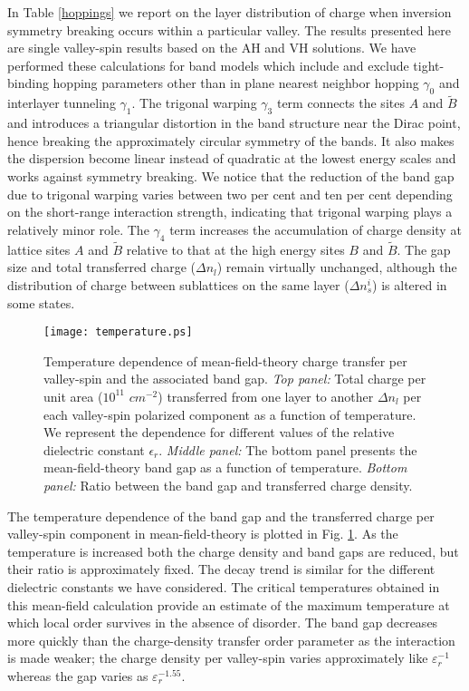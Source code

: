 \documentclass[twocolumn,prb,showpacs,preprintnumbers,amsmath,amssymb]{revtex4}
\begin{document}
In Table \ref{hoppings} we report on the layer 
distribution of charge when inversion symmetry breaking occurs within a particular valley.
The results presented here are single valley-spin results based on the AH and VH solutions.
We have performed these calculations for band models which include and exclude tight-binding hopping 
parameters other than in plane
nearest neighbor hopping $\gamma_0$ and interlayer tunneling $\gamma_1$.
The trigonal warping $\gamma_3$ term connects the sites $A$ and $\widetilde{B}$ 
and introduces a triangular distortion in the band structure 
near the Dirac point, hence breaking the approximately circular symmetry of the bands. 
It also makes the dispersion become linear instead of quadratic at the lowest energy scales 
and works against symmetry breaking. 
We notice that the reduction of the band gap due to trigonal warping varies between two per cent 
and ten per cent depending on the short-range interaction strength, indicating that trigonal warping plays a relatively minor
role.  The $\gamma_4$ term increases the accumulation of charge density at lattice
sites $A$ and $\widetilde{B}$ relative to that at the high energy sites $B$ and $\widetilde{B}$.
The gap size and total transferred charge ($\Delta n_l$) 
remain virtually unchanged, although the distribution of charge between sublattices on the same layer ($\Delta n_s^i$)
is altered in some states.  
\begin{figure}[htbp]
\begin{center}
\texttt{[image: temperature.ps]} 
\caption{
Temperature dependence of mean-field-theory charge transfer per valley-spin and the associated band gap. 
{\em Top panel:}
Total charge per unit area ($10^{11} \,\, cm^{-2}$) transferred from one layer to another $\Delta n_l$  per each valley-spin
polarized component  
as a function of temperature. We represent the dependence for different values of the relative dielectric constant $\epsilon_r$.
{\em Middle panel:}
The bottom panel presents the mean-field-theory band gap as a function of temperature. 
{\em Bottom panel:} 
Ratio between the band gap and transferred charge density.
}
\label{tempdep}
\end{center}
\end{figure}

The temperature dependence of the band gap and the transferred charge per valley-spin component
in mean-field-theory is plotted 
in Fig. \ref{tempdep}.  As the temperature is increased both the charge density and band gaps are reduced,
but their ratio is approximately fixed. 
The decay trend is similar for the different dielectric constants we have considered.
The critical temperatures obtained in this 
mean-field calculation provide an 
estimate of the maximum temperature at which local order survives in the 
absence of disorder.    
The band gap decreases more quickly than the charge-density transfer order 
parameter as the interaction is made weaker;  
the charge density per valley-spin varies approximately like 
$\varepsilon_r^{-1}$ whereas the gap varies as $\varepsilon_r^{-1.55}$.
\end{document}
